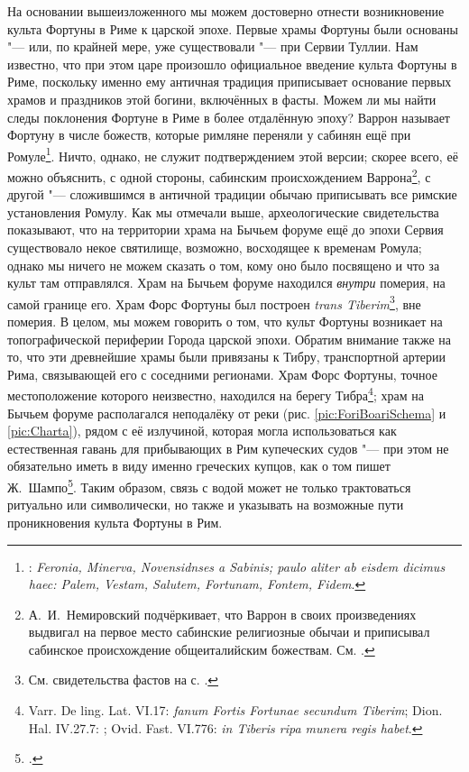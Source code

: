 На основании вышеизложенного мы можем достоверно отнести возникновение культа Фортуны в Риме к царской эпохе. Первые храмы Фортуны были основаны "--- или, по крайней мере, уже существовали "--- при Сервии Туллии. Нам известно, что при этом царе произошло официальное введение культа Фортуны в Риме, поскольку именно ему античная традиция приписывает основание первых храмов и праздников этой богини, включённых в фасты. Можем ли мы найти следы поклонения Фортуне в Риме в более отдалённую эпоху? Варрон называет Фортуну в числе божеств, которые римляне переняли у сабинян ещё при Ромуле\footnote{: \textit{Feronia, Minerva, Novensidnses a Sabinis; paulo aliter ab eisdem dicimus haec: Palem, Vestam, Salutem, Fortunam, Fontem, Fidem}.}. Ничто, однако, не служит подтверждением этой версии; скорее всего, её можно объяснить, с одной стороны, сабинским происхождением Варрона\footnote{А.~И.~Немировский подчёркивает, что Варрон в своих произведениях выдвигал на первое место сабинские религиозные обычаи и приписывал сабинское происхождение общеиталийским божествам. См. \cite[С. 6]{Nemirovsky1964}.}, с другой "--- сложившимся в античной традиции обычаю приписывать все римские установления Ромулу. Как мы отмечали выше, археологические свидетельства показывают, что на территории храма на Бычьем форуме ещё до эпохи Сервия существовало некое святилище, возможно, восходящее к временам Ромула; однако мы ничего не можем сказать о том, кому оно было посвящено и что за культ там отправлялся. Храм на Бычьем форуме находился \textit{внутри} померия, на самой границе его. Храм Форс Фортуны был построен \textit{trans Tiberim}\footnote{См. свидетельства фастов на с. \pageref{Fastae}.}, вне померия. В целом, мы можем говорить о том, что культ Фортуны возникает на топографической периферии Города царской эпохи. Обратим внимание также на то, что эти древнейшие храмы были привязаны к Тибру, транспортной артерии Рима, связывающей его с соседними регионами. Храм Форс Фортуны, точное местоположение которого неизвестно, находился на берегу Тибра\footnote{Varr. De ling. Lat. VI.17: \textit{fanum Fortis Fortunae secundum Tiberim}; Dion. Hal. IV.27.7: ; Ovid. Fast. VI.776: \textit{in Tiberis ripa munera regis habet}.}; храм на Бычьем форуме располагался неподалёку от реки (рис. \ref{pic:ForiBoariSchema} и \ref{pic:Charta}), рядом с её излучиной, которая могла использоваться как естественная гавань для прибывающих в Рим купеческих судов "--- при этом не обязательно иметь в виду именно греческих купцов, как о том пишет Ж.~Шампо\footcite[P. 214]{Champeaux1982}. Таким образом, связь с водой может не только трактоваться ритуально или символически, но также и указывать на возможные пути проникновения культа Фортуны в Рим.

